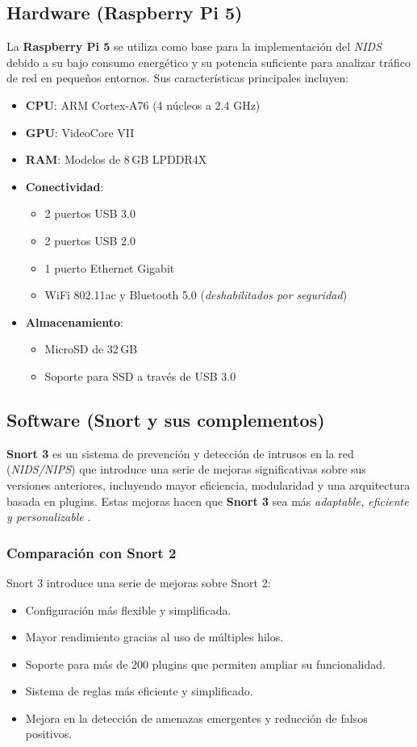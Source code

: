 \documentclass[11pt,a4paper,twoside]{report}
\begin{document}
\subsection{Hardware (Raspberry Pi 5)}

La \textbf{Raspberry Pi 5} se utiliza como base para la implementación del \textit{NIDS} debido a su bajo consumo energético y su potencia suficiente para analizar tráfico de red en pequeños entornos. Sus características principales incluyen:

\begin{itemize}
	\item \textbf{CPU}: ARM Cortex-A76 (4 núcleos a 2.4 GHz)
	\item \textbf{GPU}: VideoCore VII
	\item \textbf{RAM}: Modelos de 8\,GB LPDDR4X
	\item \textbf{Conectividad}:
	\begin{itemize}
		\item 2 puertos USB 3.0
		\item 2 puertos USB 2.0
		\item 1 puerto Ethernet Gigabit
		\item WiFi 802.11ac y Bluetooth 5.0 (\textit{deshabilitados por seguridad})
	\end{itemize}
	\item \textbf{Almacenamiento}:
	\begin{itemize}
		\item MicroSD de 32\,GB
		\item Soporte para SSD a través de USB 3.0
	\end{itemize}
\end{itemize}

\subsection{Software (Snort y sus complementos)}
\textbf{Snort 3} es un sistema de prevención y detección de intrusos en la red (\textit{NIDS/NIPS}) que introduce una serie de mejoras significativas sobre sus versiones anteriores, incluyendo mayor eficiencia, modularidad y una arquitectura basada en plugins. Estas mejoras hacen que \textbf{Snort 3} sea más \textit{adaptable, eficiente y personalizable} \cite{snort3_vs_snort2}.

\subsubsection{Comparación con Snort 2}
Snort 3 introduce una serie de mejoras sobre Snort 2:
\begin{itemize}
	\item Configuración más flexible y simplificada.
	\item Mayor rendimiento gracias al uso de múltiples hilos.
	\item Soporte para más de 200 plugins que permiten ampliar su funcionalidad.
	\item Sistema de reglas más eficiente y simplificado.
	\item Mejora en la detección de amenazas emergentes y reducción de falsos positivos.
\end{itemize}
\end{document}
